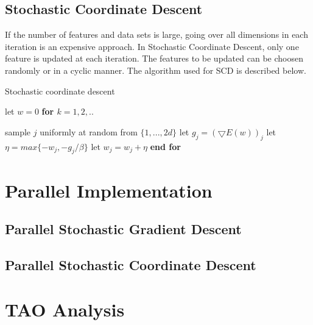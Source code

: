 \documentclass{sigplanconf}
\newlength\myindent
\newcommand\bindent{%
  \begingroup
  \setlength{\itemindent}{\myindent}
  \addtolength{\algorithmicindent}{\myindent}
}
\newcommand\eindent{\endgroup}
\begin{document}
\subsection{Stochastic Coordinate Descent}
If the number of features and data sets is large, going over all dimensions in each iteration is an
expensive approach. In Stochastic Coordinate Descent, only one feature is updated at each iteration. The 
features to be updated can be choosen randomly or in a cyclic manner. The algorithm used for SCD is 
described below.

\begin{algorithm}
\caption{Stochastic coordinate descent}
\begin{algorithmic} 
\STATE let $w = 0$
\STATE \bf{for} \begin{math} k = 1,2,.. \end{math}
    \bindent
	\STATE \textnormal{sample \begin{math}j\end{math} uniformly at random from \begin{math}\{1,...,2d\}\end{math}}
	\STATE \textnormal{let \begin{math}g_j = (\bigtriangledown{E(w)})_j\end{math}}
	\STATE \textnormal{let \begin{math}\eta = max\{ -w_j, -g_j/\beta \}\end{math}}
	\STATE \textnormal{let \begin{math}w_j = w_j + \eta\end{math}}
    \eindent
\STATE \bf{end for}
\end{algorithmic}
\end{algorithm}

\section{Parallel Implementation}
\subsection{Parallel Stochastic Gradient Descent}
\subsection{Parallel Stochastic Coordinate Descent}

\section{TAO Analysis}
\end{document}
